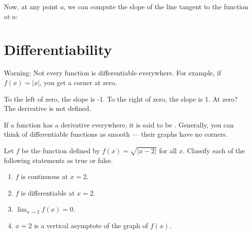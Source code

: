 Now, at any point $a$, we can compute the slope of the line tangent to 
the function at $a$:


\section{Differentiability}

Warning: Not every function is differentiable everywhere.  For
example, if $f(x) = |x|$, you get a corner at zero.


To the left of zero, the slope is -1. To the right of zero, the slope
is 1.  At zero?  The derivative is not defined.

If a function has a derivative everywhere, it is said to be
. Generally, you can think of differentiable
functions as smooth --- their graphs have no corners.

\begin{Exercise} Let $f$ 
	be the function defined by $f(x) = \sqrt{|x - 2|}$ for all $x$. 
	Classify each of the following statements as true or false. 
	\begin{enumerate}
		\item $f$ is continuous at $x = 2$. 
		\item $f$ is differentiable at $x = 2$.
		\item $\lim_{x \to 2} f(x) = 0$.
		\item $x = 2$ is a vertical asymptote of the graph of $f(x)$. 
	\end{enumerate}
\end{Exercise}

